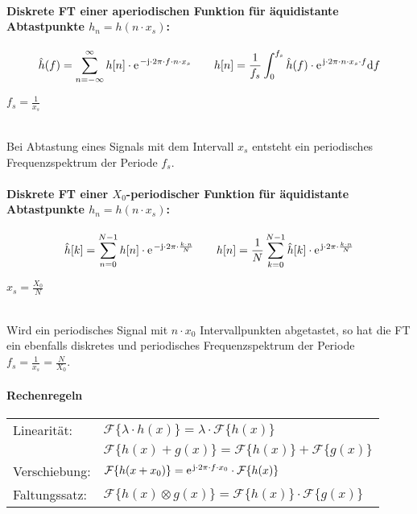 \paragraph{Diskrete FT einer aperiodischen Funktion für äquidistante Abtastpunkte $h_n = h(n\cdot x_s)$:}
\[
	\hat{h}(f) = \sum_{n = -\infty}^{\infty} h[n] \cdot \mathrm{e\;\!}^{-\mathrm{j} \cdot 2\pi \cdot f \cdot n \cdot x_s} \qquad
	h[n] = \frac{1}{f_s}\int_{0}^{f_s} \hat{h}(f) \cdot \mathrm{e\;\!}^{\mathrm{j} \cdot 2\pi \cdot n \cdot x_s \cdot f}\mathrm{d} f
\]
\begin{footnotesize}
	$f_s = \frac{1}{x_s}$\\
\end{footnotesize}
~\\
Bei Abtastung eines Signals mit dem Intervall $x_s$ entsteht ein periodisches Frequenzspektrum der Periode $f_s$.

\paragraph{Diskrete FT einer $X_0$-periodischer Funktion für äquidistante Abtastpunkte $h_n = h(n\cdot x_s)$:}
\[
	\hat{h}[k] = \sum_{n=0}^{N-1} h[n] \cdot \mathrm{e\;\!}^{-\mathrm{j} \cdot 2\pi \cdot \frac{k \cdot n}{N}} \qquad
	h[n] = \frac{1}{N} \sum_{k=0}^{N-1} \hat{h}[k] \cdot \mathrm{e\;\!}^{\mathrm{j} \cdot 2\pi \cdot \frac{k \cdot n}{N}}
\]
\begin{footnotesize}
	$x_s =\frac{X_0}{N}$\\
\end{footnotesize}
~\\
Wird ein periodisches Signal mit $n \cdot x_0$ Intervallpunkten abgetastet, so hat die FT ein ebenfalls diskretes und periodisches Frequenzspektrum der Periode $f_s = \frac{1}{x_s} = \frac{N}{X_0}$.
\\

\paragraph{Rechenregeln\\}
\begin{tabular}{ll}
	Linearität: & $\mathcal{F}\{\lambda \cdot h(x)\} = \lambda \cdot \mathcal{F}\{h(x)\}$ \\
	 & $\mathcal{F}\{h(x) + g(x)\} = \mathcal{F}\{h(x)\} + \mathcal{F}\{g(x)\}$\\
	Verschiebung: & $\mathcal{F}\{h(x+x_0)\} = \mathrm{e\;\!}^{\mathrm{j} \cdot 2\pi \cdot f \cdot x_0} \cdot \mathcal{F}\{h(x)\}$\\
	Faltungssatz: & $\mathcal{F}\{h(x) \otimes g(x)\} = \mathcal{F}\{h(x)\} \cdot \mathcal{F}\{g(x)\}$\\
\end{tabular}

